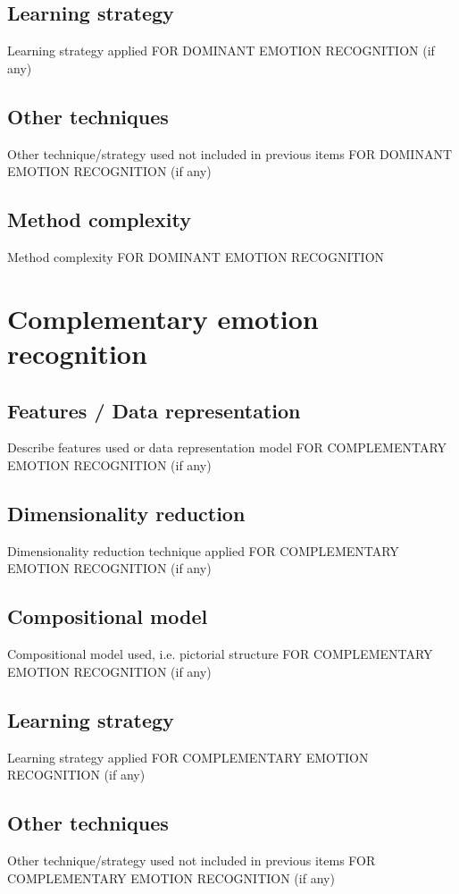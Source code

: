 \documentclass{article}
\begin{document}
\subsection{Learning strategy}
Learning strategy applied FOR DOMINANT EMOTION RECOGNITION (if any)

\subsection{Other techniques}
Other technique/strategy used not included in previous items FOR DOMINANT EMOTION RECOGNITION (if any)

\subsection{Method complexity}
Method complexity FOR DOMINANT EMOTION RECOGNITION


\section{Complementary emotion recognition}
\subsection{Features / Data representation}
Describe features used or data representation model FOR COMPLEMENTARY EMOTION RECOGNITION (if any)

\subsection{Dimensionality reduction}
Dimensionality reduction technique applied FOR COMPLEMENTARY EMOTION RECOGNITION (if any)

\subsection{Compositional model}
Compositional model used, i.e. pictorial structure FOR COMPLEMENTARY EMOTION RECOGNITION (if any)

\subsection{Learning strategy}
Learning strategy applied FOR COMPLEMENTARY EMOTION RECOGNITION (if any)

\subsection{Other techniques}
Other technique/strategy used not included in previous items FOR COMPLEMENTARY EMOTION RECOGNITION (if any)
\end{document}
